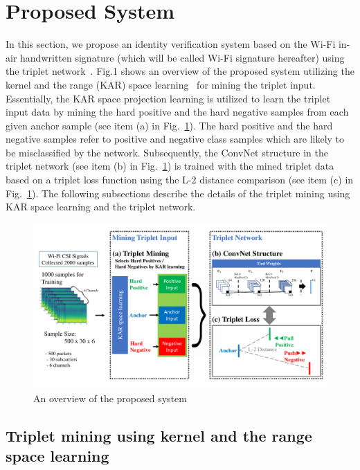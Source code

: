 \documentclass[sigconf]{acmart}
\begin{document}
\section{Proposed System}

In this section, we propose an identity verification system based on the Wi-Fi in-air handwritten signature (which will be called Wi-Fi signature hereafter) using the triplet network~\cite{hoffer2015deep}. Fig.1 shows an overview of the proposed system utilizing the kernel and the range (KAR) space learning~\cite{toh2018learning,toh2018gradient} for mining the triplet input.
Essentially, the KAR space projection learning is utilized to learn the triplet input data by mining the hard positive and the hard negative samples from each given anchor sample (see item (a) in Fig.~\ref{fig1}). The hard positive and the hard negative samples refer to positive and negative class samples which are likely to be misclassified by the network.
Subsequently, the ConvNet structure in the triplet network (see item (b) in Fig.~\ref{fig1}) is trained with the mined triplet data based on a triplet loss function using the L-2 distance comparison (see item (c) in Fig.~\ref{fig1}).
The following subsections describe the details of the triplet mining using KAR space learning and the triplet network.

\begin{figure}[!ht]
    \includegraphics[width=\textwidth]{fig1_tcnn_kar_v6}
    \caption{An overview of the proposed system} \label{fig1}
\end{figure}

\subsection{Triplet mining using kernel and the range space learning}
\end{document}
